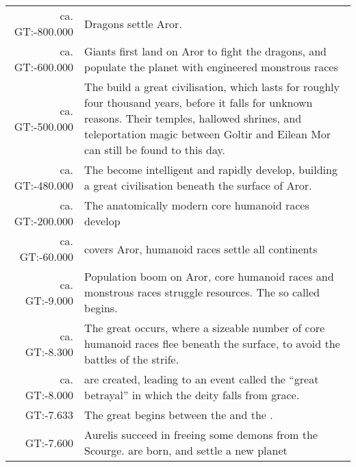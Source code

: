 \clearpage
\onecolumn
\begin{longtable}{@{\,}r <{\hskip 6pt} !{
  \color{LightSteelBlue3}
  \makebox[0pt]{\textbullet}
  \hskip -2.6pt
  \vrule width 1pt
  \hspace{\labelsep}
  }
  >{\raggedright\arraybackslash}p{11cm}
}
    ca. GT:-800.000  & Dragons settle Aror. \\
    ca. GT:-600.000  & Giants first land on Aror to fight the dragons, and
                       populate the planet with engineered monstrous races \\
    ca. GT:-500.000  & The  build a great civilisation,
                       which lasts for roughly four thousand years, before it
                       falls for unknown reasons. Their temples, hallowed
                       shrines, and teleportation magic between Goltir and
                       Eilean Mor can still be found to this day. \\
    ca. GT:-480.000  & The  become intelligent and rapidly
                       develop, building a great civilisation beneath the
                       surface of Aror. \\
    ca. GT:-200.000  & The anatomically modern core humanoid races develop \\
    ca. GT:-60.000   &  covers Aror, humanoid races
                       settle all continents \\
    ca. GT:-9.000    & Population boom on Aror, core humanoid races and
                       monstrous races struggle resources. The so called
                        begins. \\
    ca. GT:-8.300    & The great  occurs, where a sizeable
                       number of core humanoid races flee beneath the surface,
                       to avoid the battles of the strife. \\
    ca. GT:-8.000    &  are created, leading to an event
                       called the ``great betrayal'' in which the deity
                        falls from grace. \\
    GT:-7.633        & The great  begins between the
                        and the . \\
    GT:-7.600        & Aurelis succeed in freeing some demons from the Scourge.
                        are born, and settle a new planet

\end{longtable}
